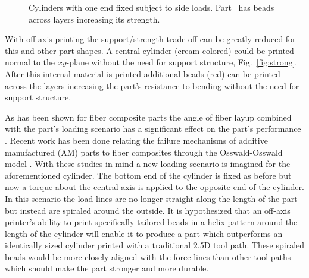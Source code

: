 \documentclass[main.tex]{subfiles}
\begin{document}
\begin{figure}
\linethickness{1.2pt}
\center
	\caption{Cylinders with one end fixed subject to side loads. Part~\protect{} has beads across layers increasing its strength.}
	\label{fig:cylinder}
\end{figure}

With off-axis printing the support/strength trade-off can be greatly reduced for this and other part shapes.
A central cylinder (cream colored) could be printed normal to the $xy$\nobreakdash-plane without the need for support structure, Fig.~\ref{fig:strong}.
After this internal material is printed additional beads (red) can be printed across the layers increasing the part's resistance to bending without the need for support structure.

As has been shown for fiber composite parts the angle of fiber layup combined with the part's loading scenario has a significant effect on the part's performance \cite{Badie2011}.
Recent work has been done relating the failure mechanisms of additive manufactured (AM) parts to fiber composites through the Osswald-Osswald model \cite{Obst2017, Osswald2017}.
%
With these studies in mind a new loading scenario is imagined for the aforementioned cylinder.
The bottom end of the cylinder is fixed as before but now a torque about the central axis is applied to the opposite end of the cylinder.
In this scenario the load lines are no longer straight along the length of the part but instead are spiraled around the outside.
It is hypothesized that an off-axis printer's ability to print specifically tailored beads in a helix pattern around the length of the cylinder will enable it to produce a part which outperforms an identically sized cylinder printed with a traditional 2.5D tool path.
These spiraled beads would be more closely aligned with the force lines than other tool paths which should make the part stronger and more durable.
\end{document}
